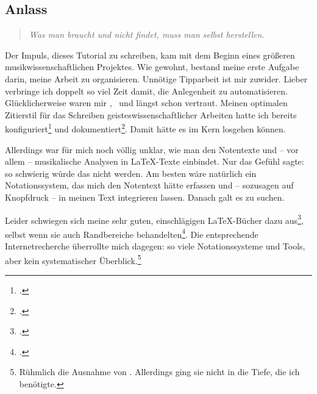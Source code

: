 %
%
%



\subsection{Anlass}

\begin{quote}\textit{Was man braucht und nicht findet, muss man selbst herstellen.}
\end{quote}

Der Impuls, dieses Tutorial zu schreiben, kam mit dem Beginn eines größeren
musikwissenschaftlichen Projektes. Wie gewohnt, bestand meine erste Aufgabe
darin, meine Arbeit zu organisieren. Unnötige Tipparbeit ist mir zuwider. Lieber
verbringe ich doppelt so viel Zeit damit, die Anlegenheit zu automatisieren.
Glücklicherweise waren mir \acc{\LaTeX}, \ und  längst
schon vertraut. Meinen optimalen Zitierstil für das Schreiben
geisteswissenschaftlicher Arbeiten hatte ich bereits
konfiguriert\footcite[vgl.][\nopage wp]{Reincke2018a} und
dokumentiert\footcite[vgl][2ff]{Reincke2018b}. Damit hätte es im Kern losgehen
können.

Allerdings war für mich noch völlig unklar, wie man den Notentexte und -- vor
allem -- musikalische Analysen in \LaTeX-Texte einbindet. Nur das Gefühl sagte:
so schwierig würde das nicht werden. Am besten wäre natürlich ein
No\-ta\-tions\-system, das mich den Notentext hätte erfassen und -- sozusagen auf
Knopfdruck -- in meinen Text integrieren lassen. Danach galt es zu suchen.

Leider schwiegen sich meine sehr guten, einschlägigen \LaTeX-Bücher dazu
aus\footcite[ vgl.][vi ff, insbesondere 905 u. 909: das umfangreiche Register
erwähnt weder Musik im allgemeinen noch LilyPond oder MusiX\TeX im
Besonderen]{Voss2012a}, selbst wenn sie auch Randbereiche
behandelten\footcite[vgl.][vii ff, insbesondere 1080 u.
1087: auch dieses umfangreiche Register erwähnt weder Musik im allgemeinen noch
LilyPond oder MusiX\TeX im Besonderen.]{MitGoo2005a}. Die entsprechende
Internetrecherche überrollte mich dagegen: so viele Notationssysteme und Tools,
aber kein systematischer Überblick.\footnote{Rühmlich die Ausnahme von
\cite[][\nopage wp]{Thoma2018a}. Allerdings ging sie nicht in die Tiefe, die ich
benötigte.}

